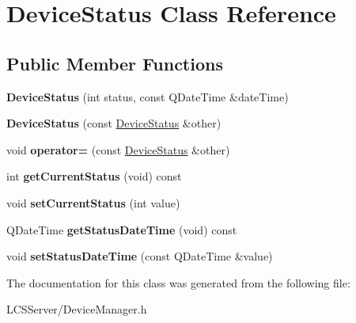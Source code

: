 \hypertarget{class_device_status}{}\section{Device\+Status Class Reference}
\label{class_device_status}
\subsection*{Public Member Functions}
\begin{DoxyCompactItemize}
\item 
\mbox{\label{class_device_status_a28c0077f5269b2c020c4963290979ee1}} 
{\bfseries Device\+Status} (int status, const Q\+Date\+Time \&date\+Time)
\item 
\mbox{\label{class_device_status_a79f1d523ceb98afe28170daf26b781a3}} 
{\bfseries Device\+Status} (const \hyperlink{class_device_status}{Device\+Status} \&other)
\item 
\mbox{\label{class_device_status_ae822d2aff82fe04ab32d037e44dd01fb}} 
void {\bfseries operator=} (const \hyperlink{class_device_status}{Device\+Status} \&other)
\item 
\mbox{\label{class_device_status_a0bd9c473925b1ebab816df6b96078a43}} 
int {\bfseries get\+Current\+Status} (void) const
\item 
\mbox{\label{class_device_status_ae4f58c4b39533c3965d85bef2163c054}} 
void {\bfseries set\+Current\+Status} (int value)
\item 
\mbox{\label{class_device_status_a0cf30022d1b60999a58fbfb84307aa72}} 
Q\+Date\+Time {\bfseries get\+Status\+Date\+Time} (void) const
\item 
\mbox{\label{class_device_status_a788e3212b95a214e99eb90a7a0448726}} 
void {\bfseries set\+Status\+Date\+Time} (const Q\+Date\+Time \&value)
\end{DoxyCompactItemize}


The documentation for this class was generated from the following file\+:\begin{DoxyCompactItemize}
\item 
L\+C\+S\+Server/Device\+Manager.\+h\end{DoxyCompactItemize}
